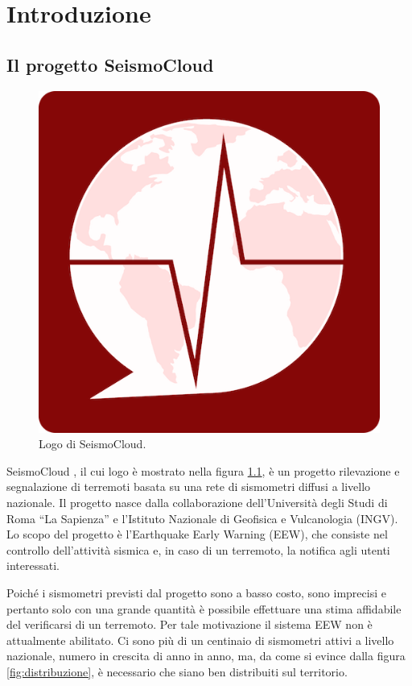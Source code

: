 \chapter{Introduzione}
\label{ch:intro}

\section{Il progetto SeismoCloud}

\begin{figure}
\centering
\includegraphics[scale=0.15]{assets/01/logoseismocloud.png}
\caption{Logo di SeismoCloud.}
\label{fig:logo}
\end{figure}

SeismoCloud \cite{seismocloud}, il cui logo è mostrato nella figura \ref{fig:logo}, è un progetto rilevazione e segnalazione di terremoti basata su una rete di sismometri diffusi a livello nazionale. Il progetto nasce dalla collaborazione dell'Università degli Studi di Roma ``La Sapienza'' e l'Istituto Nazionale di Geofisica e Vulcanologia (INGV). Lo scopo del progetto è l'Earthquake Early Warning (EEW), che consiste nel controllo dell'attività sismica e, in caso di un terremoto, la notifica agli utenti interessati.

Poiché i sismometri previsti dal progetto sono a basso costo, sono imprecisi e pertanto solo con una grande quantità è possibile effettuare una stima affidabile del verificarsi di un terremoto. Per tale motivazione il sistema EEW non è attualmente abilitato. Ci sono più di un centinaio di sismometri attivi a livello nazionale, numero in crescita di anno in anno, ma, da come si evince dalla figura \ref{fig:distribuzione}, è necessario che siano ben distribuiti sul territorio.

